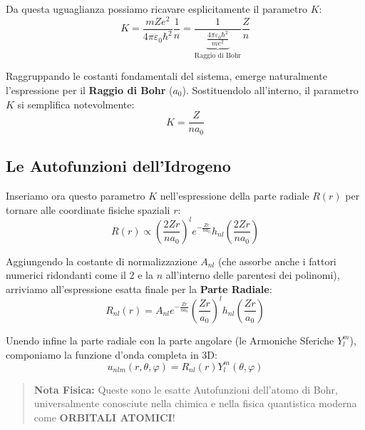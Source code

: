 \documentclass[11pt, a4paper]{article}
\begin{document}
Da questa uguaglianza possiamo ricavare esplicitamente il parametro $K$: %
\begin{equation*}
    K = \frac{m Z e^2}{4\pi\varepsilon_0 \hbar^2} \frac{1}{n} = \frac{1}{ \underbrace{ \frac{4\pi\varepsilon_0 \hbar^2}{m e^2} }_{\text{Raggio di Bohr}} } \frac{Z}{n} %
\end{equation*}

\noindent
Raggruppando le costanti fondamentali del sistema, emerge naturalmente l'espressione per il \textbf{Raggio di Bohr} ($a_0$). Sostituendolo all'interno, il parametro $K$ si semplifica notevolmente: %
\begin{equation}
    \boxed{ K = \frac{Z}{n a_0} } %
\end{equation}

\subsection{Le Autofunzioni dell'Idrogeno} %

Inseriamo ora questo parametro $K$ nell'espressione della parte radiale $R(r)$ per tornare alle coordinate fisiche spaziali $r$: %
\begin{equation*}
    R(r) \propto \left( \frac{2Zr}{n a_0} \right)^l e^{-\frac{Zr}{n a_0}} h_{nl}\left( \frac{2Zr}{n a_0} \right) %
\end{equation*}

\noindent
Aggiungendo la costante di normalizzazione $A_{nl}$ (che assorbe anche i fattori numerici ridondanti come il 2 e la $n$ all'interno delle parentesi dei polinomi), arriviamo all'espressione esatta finale per la \textbf{Parte Radiale}: %
\begin{equation}
    \boxed{ R_{nl}(r) = A_{nl} e^{-\frac{Zr}{n a_0}} \left( \frac{Zr}{a_0} \right)^l h_{nl}\left( \frac{Zr}{a_0} \right) } %
\end{equation}

\noindent
Unendo infine la parte radiale con la parte angolare (le Armoniche Sferiche $Y_l^m$), componiamo la funzione d'onda completa in 3D: %
\begin{equation}
    \boxed{ u_{nlm}(r, \theta, \varphi) = R_{nl}(r) Y_l^m(\theta, \varphi) } %
\end{equation}

\begin{quote}
    \textbf{Nota Fisica:} Queste sono le esatte Autofunzioni dell'atomo di Bohr, universalmente conosciute nella chimica e nella fisica quantistica moderna come \textbf{ORBITALI ATOMICI}! %
\end{quote}
\end{document}
